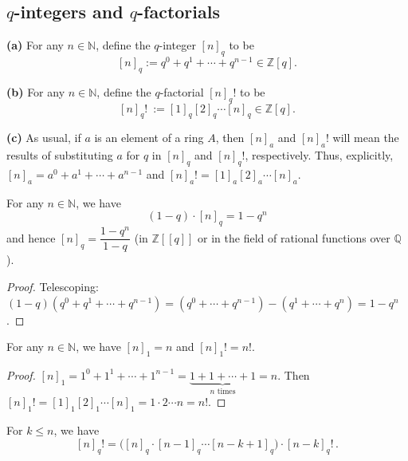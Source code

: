\subsection{$q$-integers and $q$-factorials}

\begin{definition}
\label{def.pars.qbinom.qint}
\leantarget
\leanok
\textbf{(a)} For any $n\in\mathbb{N}$, define the
$q$-integer $[n]_{q}$ to be
\[
[n]_{q}:=q^{0}+q^{1}+\cdots+q^{n-1}\in\mathbb{Z}[q].
\]

\textbf{(b)} For any $n\in\mathbb{N}$, define the $q$-factorial
$[n]_{q}!$ to be
\[
[n]_{q}!\ :=[1]_{q}[2]_{q}\cdots[n]_{q}\in\mathbb{Z}[q].
\]

\textbf{(c)} As usual, if $a$ is an element of a ring $A$, then $[n]_{a}$
and $[n]_{a}!$ will mean the results of substituting $a$ for $q$ in
$[n]_{q}$ and $[n]_{q}!$, respectively. Thus, explicitly,
$[n]_{a}=a^{0}+a^{1}+\cdots+a^{n-1}$ and
$[n]_{a}!=[1]_{a}[2]_{a}\cdots[n]_{a}$.
\end{definition}

\begin{lemma}
\label{lem.pars.qbinom.qint-geom}
\leanhelper
\leanok
For any $n\in\mathbb{N}$, we have
\[
(1-q)\cdot [n]_{q} = 1-q^{n}
\]
and hence
$[n]_{q}=\dfrac{1-q^{n}}{1-q}$
(in $\mathbb{Z}[[q]]$ or in the field
of rational functions over $\mathbb{Q}$).
\end{lemma}

\begin{proof}
Telescoping:
$(1-q)(q^{0}+q^{1}+\cdots+q^{n-1})
=(q^{0}+\cdots+q^{n-1})-(q^{1}+\cdots+q^{n})
=1-q^{n}$.
\end{proof}

\begin{lemma}
\label{lem.pars.qbinom.qint-one}
\leanhelper
\leanok
For any $n\in\mathbb{N}$, we have
$[n]_{1}=n$ and $[n]_{1}!=n!$.
\end{lemma}

\begin{proof}
\leanok
$[n]_1 = 1^0+1^1+\cdots+1^{n-1} = \underbrace{1+1+\cdots+1}_{n\text{ times}} = n$.
Then $[n]_1! = [1]_1[2]_1\cdots[n]_1 = 1\cdot 2\cdots n = n!$.
\end{proof}

\begin{lemma}
\label{lem.pars.qbinom.qfactorial-split}
\leanhelper
\leanok
For $k \le n$, we have
\[
[n]_q! = \bigl([n]_q \cdot [n{-}1]_q \cdots [n{-}k{+}1]_q\bigr) \cdot [n{-}k]_q!\,.
\]
\end{lemma}

